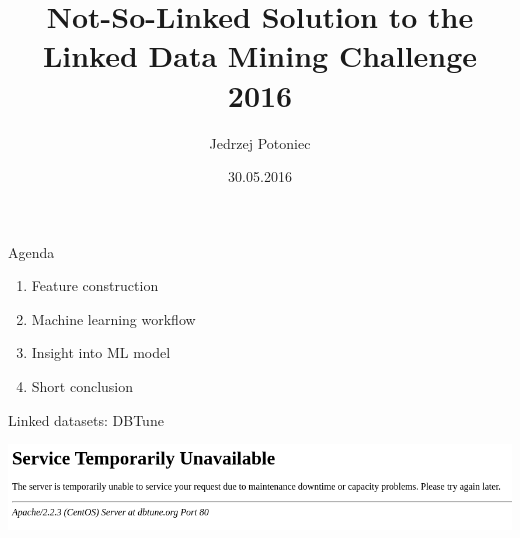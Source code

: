 \documentclass{beamer}
\title{Not-So-Linked Solution to the\\Linked Data Mining Challenge 2016}
\author{Jedrzej Potoniec}
\date{30.05.2016}
\institute{Institute of Computing Science, Poznan University of Technology}
\begin{document}
\begin{frame}
\titlepage
\end{frame}
\begin{frame}{Agenda}
\begin{enumerate}
\item Feature construction
\item Machine learning workflow
\item Insight into ML model
\item Short conclusion
\end{enumerate}
\end{frame}


%
\begin{frame}{Linked datasets: DBTune}
{
\includegraphics[width=\textwidth]{linkedbrainz.png}
}
\end{frame}
\end{document}
